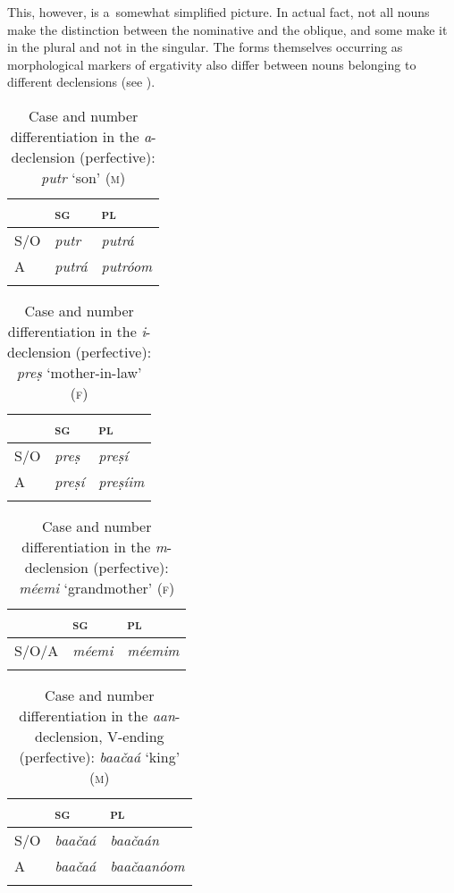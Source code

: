 This, however, is a~somewhat simplified picture. In actual fact, not all nouns make the distinction between the nominative and the oblique, and some make it in the plural and not in the singular. The forms themselves occurring as morphological markers of ergativity also differ between nouns belonging to different declensions (see ). 



\begin{table}[p]
\caption{Case and number differentiation in the \textit{a}-declension (perfective): \textit{putr} `son' \textsc{(m)}} 
\begin{tabularx}{\textwidth}{ Q Q Q }
\lsptoprule
&
\textsc{sg} &
\textsc{pl}\\\midrule
S/O &
\textit{putr} &
\textit{putrá} \\
A &
\textit{putrá} &
\textit{putróom}\\\lspbottomrule
\end{tabularx}
\label{tab:11-adecl}
\end{table}


\begin{table}[p]
\caption{Case and number differentiation in the \textit{i}-declension (perfective): \textit{preṣ} `mother-in-law' \textsc{(f)}}
\begin{tabularx}{\textwidth}{ Q Q Q }
\lsptoprule
&
\textsc{sg} &
\textsc{pl}\\\midrule
S/O &
\textit{preṣ} &
\textit{preṣí} \\
A &
\textit{preṣí} &
\textit{preṣíim} \\\lspbottomrule
\end{tabularx}
\label{tab:11-idecl}
\end{table}


\begin{table}[p]
\caption{Case and number differentiation in the \textit{m}-declension (perfective): \textit{méemi} `grandmother' \textsc{(f)}}
\begin{tabularx}{\textwidth}{ Q Q Q }
\lsptoprule
&
\textsc{sg} &
\textsc{pl}\\\midrule
S/O/A &
\textit{méemi} &
\textit{méemim} \\\lspbottomrule
\end{tabularx}
\label{tab:11-mdecl}
\end{table}


\begin{table}[p]
\caption{Case and number differentiation in the \textit{aan}-declension, V-ending (perfective): \textit{baačaá} `king' \textsc{(m)}}
\begin{tabularx}{\textwidth}{ Q Q Q }
\lsptoprule
&
\textsc{sg} &
\textsc{pl}\\\midrule
S/O &
\textit{baačaá} &
\textit{baačaán} \\
A &
\textit{baačaá} &
\textit{baačaanóom} \\\lspbottomrule
\end{tabularx}
\label{tab:11-aanvdecl}
\end{table}

